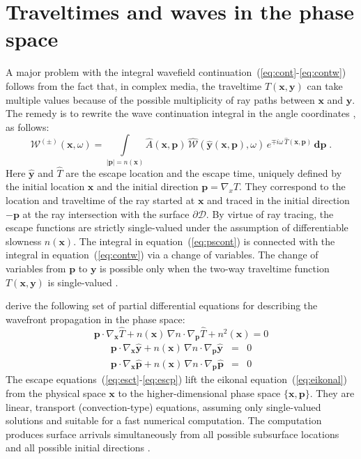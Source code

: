 \section{Traveltimes and waves in the phase space}
A major problem with the integral wavefield
continuation~(\ref{eq:cont}-\ref{eq:contw}) follows from the fact that, in
complex media, the traveltime $T(\mathbf{x},\mathbf{y})$ can take multiple
values because of the possible multiplicity of ray paths between $\mathbf{x}$
and $\mathbf{y}$. The remedy is to rewrite the wave continuation integral in
the angle coordinates \cite[]{SEG-1998-1538}, as follows:
\begin{equation}
\label{eq:pscont}
  \mathcal{W}^{(\pm)}(\mathbf{x},\omega) = 
  \int\limits_{|\mathbf{p}|=n(\mathbf{x})} 
  \widehat{A}(\mathbf{x},\mathbf{p})\,
  \widehat{\mathcal{W}}\left(\widehat{\mathbf{y}}(\mathbf{x},\mathbf{p}),
  \omega\right)\,
e^{\mp i \omega\,\widehat{T}(\mathbf{x},\mathbf{p})}\,\mathbf{d p}\;.
\end{equation}
Here $\widehat{\mathbf{y}}$ and $\widehat{T}$ are the escape location and the
escape time, uniquely defined by the initial location $\mathbf{x}$ and the
initial direction $\mathbf{p} = \nabla_x T$. They correspond to the location
and traveltime of the ray started at $\mathbf{x}$ and traced in the initial
direction $-\mathbf{p}$ at the ray intersection with the surface $\partial
\mathcal{D}$.  By virtue of ray tracing, the escape functions are strictly
single-valued under the assumption of differentiable slowness $n(\mathbf{x})$.
The integral in equation~(\ref{eq:pscont}) is connected with the integral in
equation~(\ref{eq:contw}) via a change of variables. The change of variables
from $\mathbf{p}$ to $\mathbf{y}$ is possible only when the two-way traveltime
function $T(\mathbf{x},\mathbf{y})$ is single-valued \cite[]{GEO52-07-09430964}.

\cite{pnas} derive the following set of partial differential equations
for describing the wavefront propagation in the phase space:
\begin{equation}
\label{eq:esct}
\mathbf{p} \cdot \nabla_{\mathbf{x}} \widehat{T}  + 
n(\mathbf{x})\,\nabla n \cdot \nabla_{\mathbf{p}} \widehat{T} + n^2(\mathbf{x})
= 0
\end{equation}
\begin{eqnarray}
\label{eq:escy}
  \mathbf{p} \cdot \nabla_{\mathbf{x}} \widehat{\mathbf{y}}  + 
n(\mathbf{x})\,\nabla n \cdot \nabla_{\mathbf{p}} \widehat{\mathbf{y}}
& = & 0 \\
\label{eq:escp}
  \mathbf{p} \cdot \nabla_{\mathbf{x}} \widehat{\mathbf{p}}  + 
n(\mathbf{x})\,\nabla n \cdot \nabla_{\mathbf{p}} \widehat{\mathbf{p}}
& = & 0
\end{eqnarray}
The escape equations~(\ref{eq:esct}-\ref{eq:escp}) lift the eikonal
equation~(\ref{eq:eikonal}) from the physical space $\mathbf{x}$ to the
higher-dimensional phase space $\{\mathbf{x},\mathbf{p}\}$.  They are linear,
transport (convection-type) equations, assuming only single-valued solutions
and suitable for a fast numerical computation. The computation produces
surface arrivals simultaneously from all possible subsurface locations and all
possible initial directions \cite[]{jcp}.

